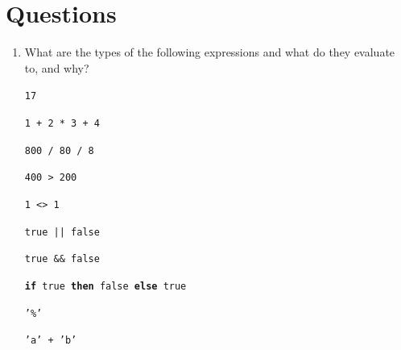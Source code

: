 \documentclass[]{book}
\begin{document}
\section*{Questions}
\begin{enumerate}
\item What are the types of the following expressions and what do they evaluate to, and why?

\vspace{1mm}
\hspace{6mm}\texttt{17}

\hspace{6mm}\texttt{1 + 2 * 3 + 4}

\hspace{6mm}\texttt{800 / 80 / 8}

\hspace{6mm}\texttt{400 > 200}

\hspace{6mm}\texttt{1 <> 1}

\hspace{6mm}\texttt{true || false}

\hspace{6mm}\texttt{true \&\& false}

\hspace{6mm}\textbf{\texttt{if}}\texttt{ true }\textbf{\texttt{then}}\texttt{ false }\textbf{\texttt{else}}\texttt{ true}

\hspace{6mm}\texttt{'\%'}

\hspace{6mm}\texttt{'a' + 'b'}


\end{enumerate}
\end{document}
